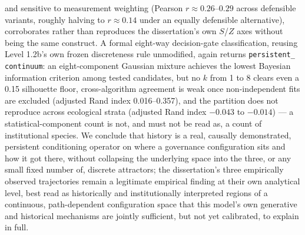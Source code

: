 and sensitive to measurement weighting (Pearson $r\approx0.26$--$0.29$
across defensible variants, roughly halving to $r\approx0.14$ under an
equally defensible alternative), corroborates rather than reproduces the
dissertation's own $S$/$Z$ axes without being the same construct. A
formal eight-way decision-gate classification, reusing Level 1.2b's own
frozen discreteness rule unmodified, again returns \texttt{persistent\_%
continuum}: an eight-component Gaussian mixture achieves the lowest Bayesian
information criterion among tested candidates, but no $k$ from 1 to 8
clears even a 0.15 silhouette floor, cross-algorithm agreement is weak once
non-independent fits are excluded (adjusted Rand index 0.016--0.357), and
the partition does not reproduce across ecological strata (adjusted Rand
index $-0.043$ to $-0.014$) --- a statistical-component count is not, and
must not be read as, a count of institutional species. We conclude that
history is a real, causally demonstrated, persistent conditioning operator
on where a governance configuration sits and how it got there, without
collapsing the underlying space into the three, or any small fixed number
of, discrete attractors; the dissertation's three empirically observed
trajectories remain a legitimate empirical finding at their own analytical
level, best read as historically and institutionally interpreted regions of
a continuous, path-dependent configuration space that this model's own
generative and historical mechanisms are jointly sufficient, but not yet
calibrated, to explain in full.
